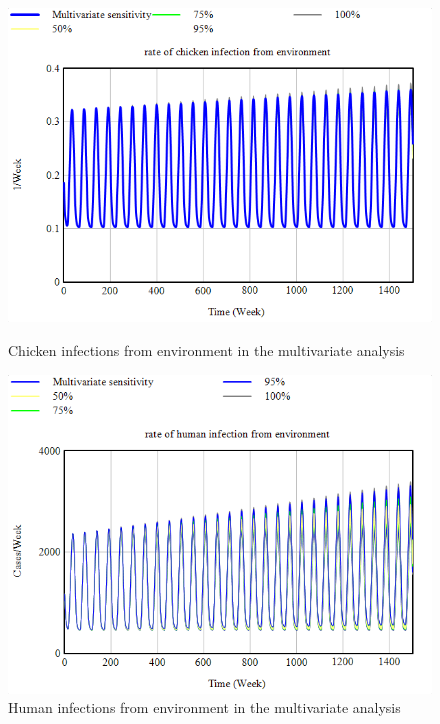\begin{figure}[h!]
    \centering
    \begin{minipage}{0.45\textwidth}
        \centering
        \includegraphics[width=1\textwidth]{images/sensitivity/Multivariate chicken infection.png} 
        \caption{Chicken infections from environment in the multivariate analysis}
        \label{fig:multi_chicken}
    \end{minipage}\hfill
    \begin{minipage}{0.45\textwidth}
        \centering
        \includegraphics[width=1\textwidth]{images/sensitivity/Multivariate human infection.png}
        \caption{Human infections from environment in the multivariate analysis}
        \label{fig:multi_human}
    \end{minipage}
\end{figure}

